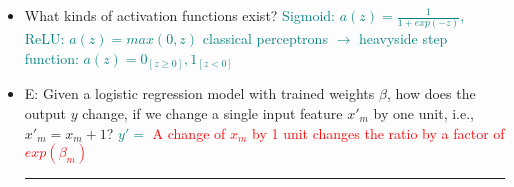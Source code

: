 \documentclass{report}
\newcommand{\asw}[2][teal]{}
\renewcommand{\asw}[2][teal]{\textcolor{#1}{#2}}
\newcommand{\qst}[2][red]{\textcolor{#1}{#2}}
\begin{document}
\begin{itemize}
	\item What kinds of activation functions exist?
	\asw{\newline Sigmoid: $a(z) = \frac{1}{1+ exp(-z)}$, ReLU: $a(z) = max(0,z)$
		\newline classical perceptrons $\rightarrow$ heavyside step function: $a(z) = 0_{[z\geq0]}, 1_{[z<0]}$}
	\item E: Given a logistic regression model with trained weights $\beta$, how does the output $y$ change, if we change a single input feature $x'_m$ by one unit, i.e., $x'_m = x_m + 1$?
	\asw{\newline $y' = $
		\newline \qst{A change of $x_m$ by 1 unit changes the ratio by a factor of $exp(\beta_m)$}}
	\newline
	\hrule 
	

\end{itemize}
\end{document}
